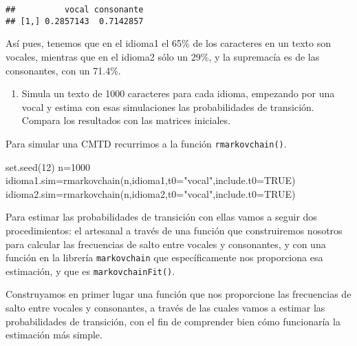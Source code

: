 \documentclass[
]{book}
\newenvironment{Shaded}{\begin{snugshade}}{\end{snugshade}}
\newcommand{\AttributeTok}[1]{\textcolor[rgb]{0.77,0.63,0.00}{#1}}
\newcommand{\ConstantTok}[1]{\textcolor[rgb]{0.00,0.00,0.00}{#1}}
\newcommand{\DecValTok}[1]{\textcolor[rgb]{0.00,0.00,0.81}{#1}}
\newcommand{\FunctionTok}[1]{\textcolor[rgb]{0.00,0.00,0.00}{#1}}
\newcommand{\NormalTok}[1]{#1}
\newcommand{\OtherTok}[1]{\textcolor[rgb]{0.56,0.35,0.01}{#1}}
\newcommand{\StringTok}[1]{\textcolor[rgb]{0.31,0.60,0.02}{#1}}
\providecommand{\tightlist}{%
  \setlength{\itemsep}{0pt}\setlength{\parskip}{0pt}}
\theoremstyle{definition}
\theoremstyle{definition}
\theoremstyle{definition}
\theoremstyle{definition}
\theoremstyle{remark}
\begin{document}
\begin{verbatim}
##          vocal consonante
## [1,] 0.2857143  0.7142857
\end{verbatim}

Así pues, tenemos que en el idioma1 el 65\% de los caracteres en un texto son vocales, mientras que en el idioma2 sólo un 29\%, y la supremacía es de las consonantes, con un 71.4\%.

\begin{enumerate}
\def\labelenumi{\arabic{enumi}.}
\setcounter{enumi}{5}
\tightlist
\item
  Simula un texto de 1000 caracteres para cada idioma, empezando por una vocal y estima con esas simulaciones las probabilidades de transición. Compara los resultados con las matrices iniciales.
\end{enumerate}

Para simular una CMTD recurrimos a la función \texttt{rmarkovchain()}.

\begin{Shaded}
\begin{Highlighting}[]
\FunctionTok{set.seed}\NormalTok{(}\DecValTok{12}\NormalTok{)}
\NormalTok{n}\OtherTok{=}\DecValTok{1000}
\NormalTok{idioma1.sim}\OtherTok{=}\FunctionTok{rmarkovchain}\NormalTok{(n,idioma1,}\AttributeTok{t0=}\StringTok{"vocal"}\NormalTok{,}\AttributeTok{include.t0=}\ConstantTok{TRUE}\NormalTok{)}
\NormalTok{idioma2.sim}\OtherTok{=}\FunctionTok{rmarkovchain}\NormalTok{(n,idioma2,}\AttributeTok{t0=}\StringTok{"vocal"}\NormalTok{,}\AttributeTok{include.t0=}\ConstantTok{TRUE}\NormalTok{)}
\end{Highlighting}
\end{Shaded}

Para estimar las probabilidades de transición con ellas vamos a seguir dos procedimientos: el artesanal a través de una función que construiremos nosotros para calcular las frecuencias de salto entre vocales y consonantes, y con una función en la librería \texttt{markovchain} que específicamente nos proporciona esa estimación, y que es \texttt{markovchainFit()}.

Construyamos en primer lugar una función que nos proporcione las frecuencias de salto entre vocales y consonantes, a través de las cuales vamos a estimar las probabilidades de transición, con el fin de comprender bien cómo funcionaría la estimación más simple.
\end{document}
